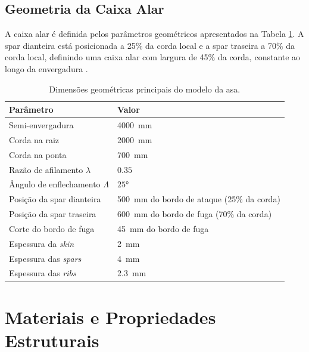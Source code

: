 \documentclass[11pt,oneside,a4paper,final]{report}
\begin{document}
\subsection{Geometria da Caixa Alar}

A caixa alar é definida pelos parâmetros geométricos apresentados na Tabela \ref{tab:geom_caixa_alar}. A spar dianteira está posicionada a 25\% da corda local e a spar traseira a 70\% da corda local, definindo uma caixa alar com largura de 45\% da corda, constante ao longo da envergadura \cite{Niu1988}.

\begin{table}[H]
\centering
\caption{Dimensões geométricas principais do modelo da asa.}
\label{tab:geom_caixa_alar}
\renewcommand{\arraystretch}{1.4}
\begin{tabularx}{\textwidth}{p{5.5cm} X}
\toprule
\textbf{Parâmetro} & \textbf{Valor} \\
\midrule
Semi-envergadura                    
    & \SI{4000}{\milli\meter} \\
Corda na raiz                       
    & \SI{2000}{\milli\meter} \\
Corda na ponta                      
    & \SI{700}{\milli\meter} \\
Razão de afilamento $\lambda$       
    & $0.35$ \\
Ângulo de enflechamento $\Lambda$   
    & $\ang{25}$ \\
Posição da spar dianteira           
    & \SI{500}{\milli\meter} do bordo de ataque (25\% da corda) \\
Posição da spar traseira            
    & \SI{600}{\milli\meter} do bordo de fuga (70\% da corda) \\
Corte do bordo de fuga              
    & \SI{45}{\milli\meter} do bordo de fuga \\
Espessura da \textit{skin}          
    & \SI{2}{\milli\meter} \\
Espessura das \textit{spars}            
    & \SI{4}{\milli\meter} \\
Espessura das \textit{ribs}              
    & \SI{2.3}{\milli\meter} \\
\bottomrule
\end{tabularx}
\end{table}

\section{Materiais e Propriedades Estruturais}
\end{document}

